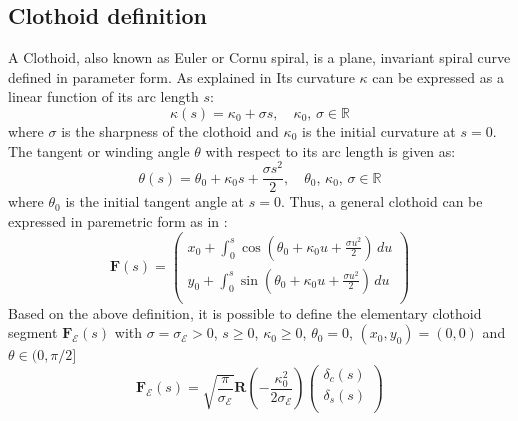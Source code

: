\documentclass[a4paper,12pt,sort&compress]{article}
\begin{document}
    \subsection{Clothoid definition}
    A Clothoid, also known as Euler or Cornu spiral, is a plane, invariant spiral curve defined in
    parameter form. As explained in \citep*{7962257} Its curvature $\kappa$ can be expressed as a linear function of its arc length
    $s$:
    \begin{equation} 
        \kappa (s)=\kappa _0 + \sigma s, \quad \kappa _0, \, \sigma \in \mathbb {R} 
    \end{equation}
    where $\sigma$ is the sharpness of the clothoid and $\kappa _0$ is the initial curvature at
    $s=0$. The tangent or winding angle $\theta$ with respect to its arc length is given as:
    \begin{equation} 
        \theta (s)=\theta _0+\kappa _0 s+\frac{\sigma s^2}{2}, \quad \theta _0, \, \kappa _0, \, \sigma \in \mathbb {R} 
    \end{equation}
    where $\theta _0$ is the initial tangent angle at $s=0$. Thus, a general clothoid can be
    expressed in paremetric form as in \citep*{nutbourne1972curvature}:
    \begin{equation} 
        \mathbf {F}(s) = 
        {\left(
            \begin{array}
                {c} x_0+\int _0^s \cos \left(\theta _0+\kappa _0 u +\frac{\sigma u^2}{2}\right) \, du \\ 
                y_0+\int _0^s \sin \left(\theta _0+\kappa _0 u +\frac{\sigma u^2}{2}\right) \, du \\ 
            \end{array}
        \right)} 
    \end{equation}
    Based on the above definition, it is possible to define the elementary clothoid segment $\mathbf
    {F}_{{\mathcal {E}}}(s)$ with $\sigma = \sigma _\mathcal{E} > 0$, $s \geq 0$, $\kappa _0 \geq
    0$, $\theta _0 = 0$, $(x_0, y_0) = (0,0)$ and $\theta \in (0, \pi/2]$
    \begin{equation} 
        \mathbf {F}_{{\mathcal {E}}}(s)= \sqrt{\frac{\pi }{\sigma _{{\mathcal {E}}}}} \mathbf {R} 
        \left(
            -\frac{\kappa _{0}^2}{2 \sigma _{{\mathcal {E}}}}
        \right) 
        {\left(
            \begin{array}
                {c}\delta _c(s) \\ \delta _s(s)\\ 
            \end{array}
        \right)} 
    \end{equation}
\end{document}
